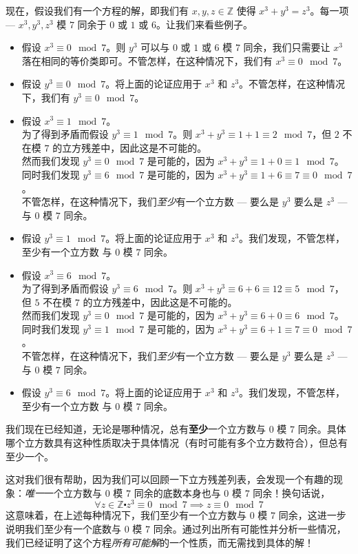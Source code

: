 \begin{example}
    现在，假设我们有一个方程的解，即我们有 $x, y, z \in \mathbb{Z}$ 使得 $x^3 + y^3 = z^3$。每一项 --- $x^3,y^3,z^3$ 模 $7$ 同余于 $0$ 或 $1$ 或 $6$。让我们来看些例子。
    \begin{itemize}
        \item 假设 $x^3 \equiv 0 \mod 7$。则 $y^3$ 可以与 $0$ 或 $1$ 或 $6$ 模 $7$ 同余，我们只需要让 $x^3$ 落在相同的等价类即可。不管怎样，在这种情况下，我们有 $x^3 \equiv 0 \mod 7$。
        \item 假设 $y^3 \equiv 0 \mod 7$。将上面的论证应用于 $x^3$ 和 $z^3$。不管怎样，在这种情况下，我们有 $y^3 \equiv 0 \mod 7$。
        \item 假设 $x^3 \equiv 1 \mod 7$。\\
            为了得到矛盾而假设 $y^3 \equiv 1 \mod 7$。则 $x^3+y^3 \equiv 1+1 \equiv 2 \mod 7$，但 $2$ 不在模 $7$ 的立方残差中，因此这是不可能的。\\
            然而我们发现 $y^3 \equiv 0 \mod 7$ 是可能的，因为 $x^3+y^3 \equiv 1+0 \equiv 1 \mod 7$。\\
            同时我们发现 $y^3 \equiv 6 \mod 7$ 是可能的，因为 $x^3+y^3 \equiv 1+6 \equiv 7 \equiv 0 \mod 7$。\\
            不管怎样，在这种情况下，我们\emph{至少}有一个立方数 --- 要么是 $y^3$ 要么是 $z^3$ --- 与 $0$ 模 $7$ 同余。
        \item 假设 $y^3 \equiv 1 \mod 7$。将上面的论证应用于 $x^3$ 和 $z^3$。我们发现，不管怎样，至少有一个立方数 与 $0$ 模 $7$ 同余。
        \item 假设 $x^3 \equiv 6 \mod 7$。\\
            为了得到矛盾而假设 $y^3 \equiv 6 \mod 7$。则 $x^3+y^3 \equiv 6+6 \equiv 12 \equiv 5 \mod 7$，但 $5$ 不在模 $7$ 的立方残差中，因此这是不可能的。\\
            然而我们发现 $y^3 \equiv 0 \mod 7$ 是可能的，因为 $x^3+y^3 \equiv 6+0 \equiv 6 \mod 7$。\\
            同时我们发现 $y^3 \equiv 1 \mod 7$ 是可能的，因为 $x^3+y^3 \equiv 6+1 \equiv 7 \equiv 0 \mod 7$。\\
            不管怎样，在这种情况下，我们\emph{至少}有一个立方数 --- 要么是 $y^3$ 要么是 $z^3$ --- 与 $0$ 模 $7$ 同余。
        \item 假设 $y^3 \equiv 6 \mod 7$。将上面的论证应用于 $x^3$ 和 $z^3$。我们发现，不管怎样，至少有一个立方数 与 $0$ 模 $7$ 同余。
    \end{itemize}

    我们现在已经知道，无论是哪种情况，总有\textbf{至少}一个立方数与 $0$ 模 $7$ 同余。具体哪个立方数具有这种性质取决于具体情况（有时可能有多个立方数符合），但总有至少一个。

    这对我们很有帮助，因为我们可以回顾一下立方残差列表，会发现一个有趣的现象：\emph{唯一}一个立方数与 $0$ 模 $7$ 同余的底数本身也与 $0$ 模 $7$ 同余！换句话说，
    \[\forall z \in \mathbb{Z} \centerdot z^3 \equiv 0 \mod 7 \implies z \equiv 0 \mod 7\]
    这意味着，在上述每种情况下，我们至少有一个立方数与 $0$ 模 $7$ 同余，这进一步说明我们至少有一个底数与 $0$ 模 $7$ 同余。通过列出所有可能性并分析一些情况，我们已经证明了这个方程\emph{所有可能解}的一个性质，而无需找到具体的解！
\end{example}

